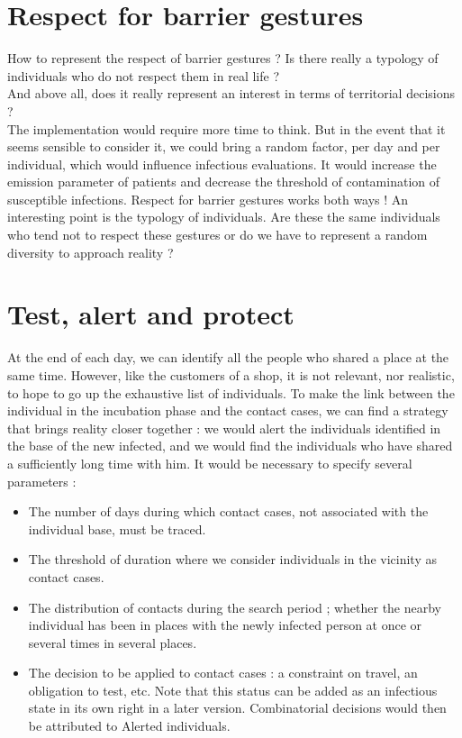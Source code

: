 \newpage

\section{Respect for barrier gestures}

How to represent the respect of barrier gestures ? Is there really a typology of individuals who do not respect them in real life ?\\
And above all, does it really represent an interest in terms of territorial decisions ?\\

The implementation would require more time to think. But in the event that it seems sensible to consider it, we could bring a random factor, per day and per individual, which would influence infectious evaluations. It would increase the emission parameter of patients and decrease the threshold of contamination of susceptible infections. Respect for barrier gestures works both ways ! An interesting point is the typology of individuals. Are these the same individuals who tend not to respect these gestures or do we have to represent a random diversity to approach reality ?

\newpage

\section{Test, alert and protect}

At the end of each day, we can identify all the people who shared a place at the same time. However, like the customers of a shop, it is not relevant, nor realistic, to hope to go up the exhaustive list of individuals. To make the link between the individual in the incubation phase and the contact cases, we can find a strategy that brings reality closer together : we would alert the individuals identified in the base of the new infected, and we would find the individuals who have shared a sufficiently long time with him. It would be necessary to specify several parameters :\\

\begin{itemize}
\item The number of days during which contact cases, not associated with the individual base, must be traced.
\item The threshold of duration where we consider individuals in the vicinity as contact cases.
\item The distribution of contacts during the search period ; whether the nearby individual has been in places with the newly infected person at once or several times in several places.
\item The decision to be applied to contact cases : a constraint on travel, an obligation to test, etc. Note that this status can be added as an infectious state in its own right in a later version. Combinatorial decisions would then be attributed to Alerted individuals.\\
\end{itemize}